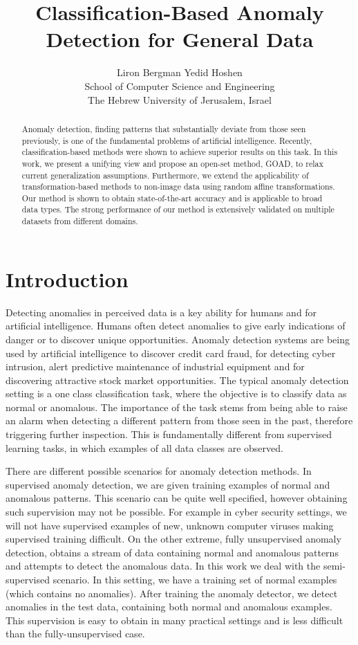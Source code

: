 \documentclass{article} \usepackage{iclr2020_conference,times}
\title{Classification-Based Anomaly Detection for General Data}
\author{Liron Bergman \space\space\space\space\space\space\space Yedid Hoshen \\
   School of Computer Science and Engineering \\
  The Hebrew University of Jerusalem, Israel \\
}
\begin{document}
\maketitle

\begin{abstract}
Anomaly detection, finding patterns that substantially deviate from those seen previously, is one of the fundamental problems of artificial intelligence. Recently, classification-based methods were shown to achieve superior results on this task. In this work, we present a unifying view and propose an open-set method, GOAD, to relax current generalization assumptions. Furthermore, we extend the applicability of transformation-based methods to non-image data using random affine transformations. Our method is shown to obtain state-of-the-art accuracy and is applicable to broad data types. The strong performance of our method is extensively validated on multiple datasets from different domains.  
\end{abstract}

\section{Introduction}
\label{sec:intro}

Detecting anomalies in perceived data is a key ability for humans and for artificial intelligence. Humans often detect anomalies to give early indications of danger or to discover unique opportunities. Anomaly detection systems are being used by artificial intelligence to discover credit card fraud, for detecting cyber intrusion, alert predictive maintenance of industrial equipment and for discovering attractive stock market opportunities. The typical anomaly detection setting is a one class classification task, where the objective is to classify data as normal or anomalous. The importance of the task stems from being able to raise an alarm when detecting a different pattern from those seen in the past, therefore triggering further inspection. This is fundamentally different from supervised learning tasks, in which examples of all data classes are observed.

There are different possible scenarios for anomaly detection methods. In supervised anomaly detection, we are given training examples of normal and anomalous patterns. This scenario can be quite well specified, however obtaining such supervision may not be possible. For example in cyber security settings, we will not have supervised examples of new, unknown computer viruses  making supervised training difficult. On the other extreme, fully unsupervised anomaly detection, obtains a stream of data containing normal and anomalous patterns and attempts to detect the anomalous data. In this work we deal with the semi-supervised scenario. In this setting, we have a training set of normal examples (which contains no anomalies). After training the anomaly detector, we detect anomalies in the test data, containing both normal and anomalous examples. This supervision is easy to obtain in many practical settings and is less difficult than the fully-unsupervised case.
\end{document}
